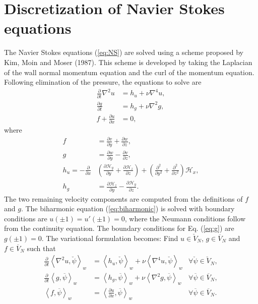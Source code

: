 \documentclass[11pt, oneside]{article}
\newcommand{\N}[1]{\check{#1}}
\newcommand{\D}[1]{\overline{#1}}
\begin{document}
\section{Discretization of Navier Stokes equations}
\label{sec:discretizationNS}
The Navier Stokes equations (\ref{eq:NS}) are solved using a scheme 
proposed by Kim, Moin and Moser (1987). This scheme is developed by taking the 
Laplacian of the wall normal momentum equation and the curl of the momentum 
equation. Following elimination of the pressure, the equations to solve are 
\begin{align}
\frac{\partial}{\partial t} \nabla^2 u &= h_u + \nu \nabla^4 u, 
\label{eq:biharmonic} \\
\frac{\partial g}{\partial t} &= h_g + \nu \nabla^2 g, \label{eq:g} \\
f + \frac{\partial u}{\partial x} &= 0, \label{eq:f}
\end{align}
where
\begin{align}
f &= \frac{\partial v}{\partial y} + \frac{\partial w}{\partial z}, \\
g &= \frac{\partial w}{\partial y} - \frac{\partial v}{\partial z}, \\
h_u = -\frac{\partial}{\partial x} &\left( \frac{\partial 
\mathcal{H}_y}{\partial y} + \frac{\partial \mathcal{H}_z}{\partial z} \right) 
+ \left(\frac{\partial^2}{\partial y^2} + \frac{\partial^2}{\partial z^2} 
\right) \mathcal{H}_x ,
\\
h_g &= \frac{\partial \mathcal{H}_z}{\partial y} - \frac{\partial 
\mathcal{H}_y}{\partial z}.
\end{align}
The two remaining velocity components are computed from the definitions of $f$ 
and $g$. The biharmonic equation (\ref{eq:biharmonic}) is solved with boundary 
conditions are $u(\pm 1) = u'(\pm 1) = 0$, where the Neumann conditions follow 
from the continuity equation. The boundary conditions for Eq. (\ref{eq:g}) are 
$g(\pm 1) = 0$. The variational formulation becomes: Find ${u} \in 
\N{V}_N$, ${g} \in \D{V}_N$ and ${f} \in \D{V}_N$ such that
\begin{align}
	\frac{\partial }{\partial t} \left< \nabla^2 u, \N{\psi}\right>_w &= 
	\left<h_u, \N{\psi} \right>_w + \nu \left<\nabla^4u, \N{\psi}\right>_w 
	&\forall \N{\psi} \in \N{V}_N, \label{eq:u1} \\
	\frac{\partial}{\partial t}\left<g, \D{\psi}\right>_w &= \left<h_g, 
	\D{\psi}\right>_w + \nu 
	\left<\nabla^2 g, \D{\psi}\right>_w &\forall \D{\psi} \in \D{V}_N ,
	\label{eq:g1} \\
	\left<f, \D{\psi}\right>_w &= \left<\frac{\partial u}{\partial x}, 
	\D{\psi}\right>_w &\forall \D{\psi} \in \D{V}_N. \label{eq:f1}
\end{align}
\end{document}
